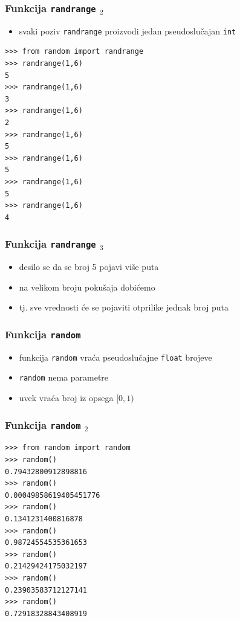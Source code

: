 \documentclass[utf8,compress,aspectratio=169]{beamer}
\begin{document}
\begin{frame}[fragile,shrink=5]
  \frametitle{Funkcija \texttt{randrange} $_2$}
  \begin{itemize}
    \item svaki poziv \texttt{randrange} proizvodi jedan pseudoslučajan \texttt{int}
  \end{itemize}
\begin{verbatim}
>>> from random import randrange
>>> randrange(1,6)
5
>>> randrange(1,6)
3
>>> randrange(1,6)
2
>>> randrange(1,6)
5
>>> randrange(1,6)
5
>>> randrange(1,6)
5
>>> randrange(1,6)
4
\end{verbatim}
\end{frame}

\begin{frame}
  \frametitle{Funkcija \texttt{randrange} $_3$}
  \begin{itemize}
    \item desilo se da se broj 5 pojavi više puta
    \item na velikom broju pokušaja dobićemo 
    \item tj. sve vrednosti će se pojaviti otprilike jednak broj puta
  \end{itemize}
\end{frame}

\begin{frame}
  \frametitle{Funkcija \texttt{random}}
  \begin{itemize}
    \item funkcija \texttt{random} vraća pseudoslučajne \texttt{float} brojeve
    \item \texttt{random} nema parametre
    \item uvek vraća broj iz opsega $[0,1)$
  \end{itemize}
\end{frame}

\begin{frame}[fragile]
  \frametitle{Funkcija \texttt{random} $_2$}
\begin{verbatim}
>>> from random import random
>>> random()
0.79432800912898816
>>> random()
0.00049858619405451776
>>> random()
0.1341231400816878
>>> random()
0.98724554535361653
>>> random()
0.21429424175032197
>>> random()
0.23903583712127141
>>> random()
0.72918328843408919
\end{verbatim}
\end{frame}
\end{document}
